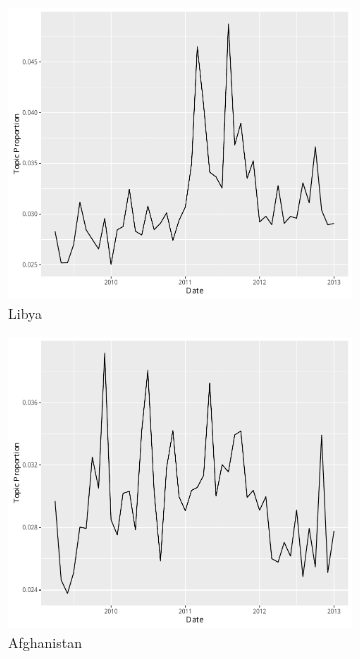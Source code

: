\documentclass[12pt]{article}
\theoremstyle{definition}
\theoremstyle{algodesc}
\begin{document}
\begin{figure}[h]
\begin{subfigure}[Libya]{.30\linewidth}
    \includegraphics[width=\linewidth]{../images/time_plot18.pdf}
    \caption{Libya} \label{fig:t3}
\end{subfigure}
\begin{subfigure}[Afghanistan]{.30\linewidth}
    \includegraphics[width=\linewidth]{../images/time_plot27.pdf}
    \caption{Afghanistan} \label{fig:t4}
\end{subfigure}
\begin{subfigure}[Int. Dev.]{.30\linewidth}

\end{subfigure}
\end{figure}
\end{document}
